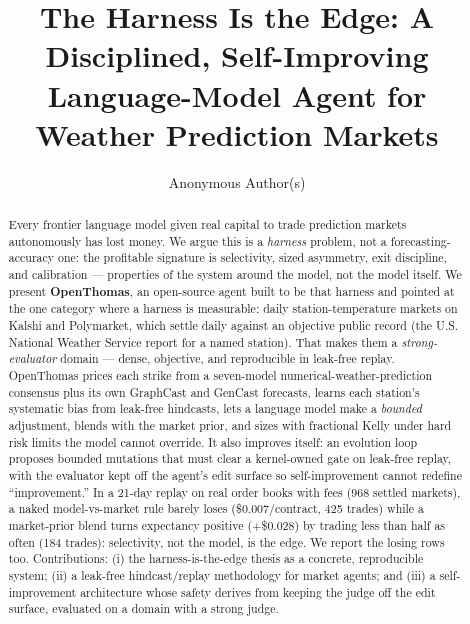 \documentclass[sigconf,review,anonymous]{acmart}
\begin{document}
\title{The Harness Is the Edge: A Disciplined, Self-Improving Language-Model
Agent for Weather Prediction Markets}

\author{Anonymous Author(s)}
\affiliation{%
  \institution{}
  \country{}
}

\begin{abstract}
Every frontier language model given real capital to trade prediction markets
autonomously has lost money. We argue this is a \emph{harness} problem, not a
forecasting-accuracy one: the profitable signature is selectivity, sized
asymmetry, exit discipline, and calibration --- properties of the system around
the model, not the model itself. We present \textbf{OpenThomas}, an open-source
agent built to be that harness and pointed at the one category where a harness is
measurable: daily station-temperature markets on Kalshi and Polymarket, which
settle daily against an objective public record (the U.S. National Weather
Service report for a named station). That makes them a \emph{strong-evaluator}
domain --- dense, objective, and reproducible in leak-free replay. OpenThomas
prices each strike from a seven-model numerical-weather-prediction consensus plus
its own GraphCast and GenCast forecasts, learns each station's systematic bias
from leak-free hindcasts, lets a language model make a \emph{bounded} adjustment,
blends with the market prior, and sizes with fractional Kelly under hard risk
limits the model cannot override. It also improves itself: an evolution loop
proposes bounded mutations that must clear a kernel-owned gate on leak-free
replay, with the evaluator kept off the agent's edit surface so self-improvement
cannot redefine ``improvement.'' In a 21-day replay on real order books with fees
(968 settled markets), a naked model-vs-market rule barely loses
(\$0.007/contract, 425 trades) while a market-prior blend turns expectancy
positive ($+$\$0.028) by trading less than half as often (184 trades):
selectivity, not the model, is the edge. We report the losing rows too.
Contributions: (i) the harness-is-the-edge thesis as a concrete, reproducible
system; (ii) a leak-free hindcast/replay methodology for market agents; and (iii)
a self-improvement architecture whose safety derives from keeping the judge off
the edit surface, evaluated on a domain with a strong judge.
\end{abstract}

\end{document}
